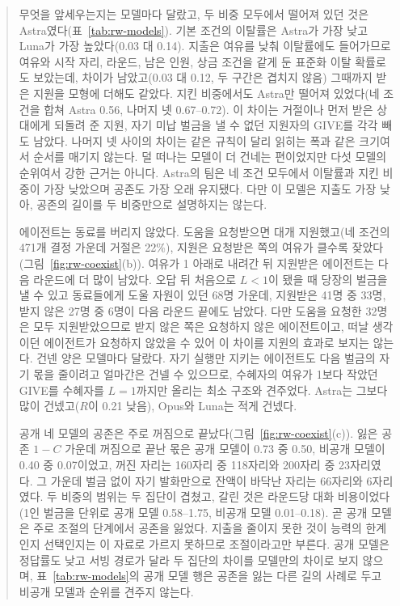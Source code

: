 \begin{quote}
{\color{black}무엇을 앞세우는지는 모델마다 달랐고, 두 비중 모두에서 떨어져 있던 것은 Astra였다(표~\ref{tab:rw-models}). 기본 조건의 이탈률은 Astra가 가장 낮고 Luna가 가장 높았다(0.03 대 0.14). 지출은 여유를 낮춰 이탈률에도 들어가므로 여유와 시작 자리, 라운드, 남은 인원, 상금 조건을 같게 둔 표준화 이탈 확률로도 보았는데, 차이가 남았고(0.03 대 0.12, 두 구간은 겹치지 않음) 그때까지 받은 지원을 모형에 더해도 같았다. 지킨 비중에서도 Astra만 떨어져 있었다(네 조건을 합쳐 Astra 0.56, 나머지 넷 0.67--0.72). 이 차이는 거절이나 먼저 받은 상대에게 되돌려 준 지원, 자기 미납 벌금을 낼 수 없던 지원자의 GIVE를 각각 빼도 남았다. 나머지 넷 사이의 차이는 같은 규칙이 달리 읽히는 폭과 같은 크기여서 순서를 매기지 않는다. 덜 떠나는 모델이 더 건네는 편이었지만 다섯 모델의 순위여서 강한 근거는 아니다. Astra의 팀은 네 조건 모두에서 이탈률과 지킨 비중이 가장 낮았으며 공존도 가장 오래 유지됐다. 다만 이 모델은 지출도 가장 낮아, 공존의 길이를 두 비중만으로 설명하지는 않는다.}

{\color{black}에이전트는 동료를 버리지 않았다. 도움을 요청받으면 대개 지원했고(네 조건의 471개 결정 가운데 거절은 22\%), 지원은 요청받은 쪽의 여유가 클수록 잦았다(그림~\ref{fig:rw-coexist}(b)). 여유가 1 아래로 내려간 뒤 지원받은 에이전트는 다음 라운드에 더 많이 남았다. 오답 뒤 처음으로 $L<1$이 됐을 때 당장의 벌금을 낼 수 있고 동료들에게 도울 자원이 있던 68명 가운데, 지원받은 41명 중 33명, 받지 않은 27명 중 6명이 다음 라운드 끝에도 남았다. 다만 도움을 요청한 32명은 모두 지원받았으므로 받지 않은 쪽은 요청하지 않은 에이전트이고, 떠날 생각이던 에이전트가 요청하지 않았을 수 있어 이 차이를 지원의 효과로 보지는 않는다. 건넨 양은 모델마다 달랐다. 자기 실행만 지키는 에이전트도 다음 벌금의 자기 몫을 줄이려고 얼마간은 건넬 수 있으므로, 수혜자의 여유가 1보다 작았던 GIVE를 수혜자를 $L=1$까지만 올리는 최소 구조와 견주었다. Astra는 그보다 많이 건넸고($R$이 0.21 낮음), Opus와 Luna는 적게 건넸다.}

{\color{black}공개 네 모델의 공존은 주로 꺼짐으로 끝났다(그림~\ref{fig:rw-coexist}(c)). 잃은 공존 $1-C$ 가운데 꺼짐으로 끝난 몫은 공개 모델이 0.73 중 0.50, 비공개 모델이 0.40 중 0.07이었고, 꺼진 자리는 160자리 중 118자리와 200자리 중 23자리였다. 그 가운데 벌금 없이 자기 발화만으로 잔액이 바닥난 자리는 66자리와 6자리였다. 두 비중의 범위는 두 집단이 겹쳤고, 갈린 것은 라운드당 대화 비용이었다(1인 벌금을 단위로 공개 모델 0.58--1.75, 비공개 모델 0.01--0.18). 곧 공개 모델은 주로 조절의 단계에서 공존을 잃었다. 지출을 줄이지 못한 것이 능력의 한계인지 선택인지는 이 자료로 가르지 못하므로 조절이라고만 부른다. 공개 모델은 정답률도 낮고 서빙 경로가 달라 두 집단의 차이를 모델만의 차이로 보지 않으며, 표~\ref{tab:rw-models}의 공개 모델 행은 공존을 잃는 다른 길의 사례로 두고 비공개 모델과 순위를 견주지 않는다.}


\end{quote}
